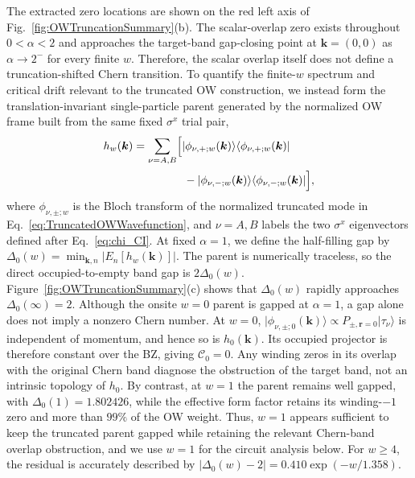 \documentclass[aps,prb,twocolumn,superscriptaddress,longbibliography,floatfix]{revtex4-2}
\newcommand{\mc}[1]{\mathcal{#1}}
\theoremstyle{plain}
\theoremstyle{definition}
\theoremstyle{remark}
\begin{document}
The extracted zero locations are shown on the red left axis of Fig.~\ref{fig:OWTruncationSummary}(b). The scalar-overlap zero exists throughout $0<\alpha<2$ and approaches the target-band gap-closing point at $\boldsymbol k=(0,0)$ as $\alpha\to2^-$ for every finite $w$. Therefore, the scalar overlap itself does not define a truncation-shifted Chern transition. To quantify the finite-$w$ spectrum and critical drift relevant to the truncated OW construction, we instead form the translation-invariant single-particle parent generated by the normalized OW frame built from the same fixed $\sigma^x$ trial pair,
\begin{align}
    h_w(\boldsymbol k)
    &=
    \sum_{\nu=A,B}
    \Bigl[
    \lvert\phi_{\nu,+;w}(\boldsymbol k)\rangle
    \langle\phi_{\nu,+;w}(\boldsymbol k)\rvert
    \nonumber\\[1pt]
    &\hspace{4.5em}
    -
    \lvert\phi_{\nu,-;w}(\boldsymbol k)\rangle
    \langle\phi_{\nu,-;w}(\boldsymbol k)\rvert
    \Bigr],
    \label{eq:TruncatedOWFrameHamiltonian}
\end{align}
where $\phi_{\nu,\pm;w}$ is the Bloch transform of the normalized truncated mode in Eq.~\eqref{eq:TruncatedOWWavefunction}, and $\nu=A,B$ labels the two $\sigma^x$ eigenvectors defined after Eq.~\eqref{eq:chi_CI}. At fixed $\alpha=1$, we define the half-filling gap by $\Delta_0(w)=\min_{\boldsymbol k,n}|E_n[h_w(\boldsymbol k)]|$. The parent is numerically traceless, so the direct occupied-to-empty band gap is $2\Delta_0(w)$. Figure~\ref{fig:OWTruncationSummary}(c) shows that $\Delta_0(w)$ rapidly approaches $\Delta_0(\infty)=2$. Although the onsite $w=0$ parent is gapped at $\alpha=1$, a gap alone does not imply a nonzero Chern number. At $w=0$, $\lvert\phi_{\nu,\pm;0}(\boldsymbol k)\rangle\propto P_{\pm,\boldsymbol r=0}\lvert\tau_\nu\rangle$ is independent of momentum, and hence so is $h_0(\boldsymbol k)$. Its occupied projector is therefore constant over the BZ, giving $\mc C_0=0$. Any winding zeros in its overlap with the original Chern band diagnose the obstruction of the target band, not an intrinsic topology of $h_0$. By contrast, at $w=1$ the parent remains well gapped, with $\Delta_0(1)=1.802426$, while the effective form factor retains its winding-$-1$ zero and more than $99\%$ of the OW weight. Thus, $w=1$ appears sufficient to keep the truncated parent gapped while retaining the relevant Chern-band overlap obstruction, and we use $w=1$ for the circuit analysis below. For $w\geq4$, the residual is accurately described by $|\Delta_0(w)-2|=0.410\exp(-w/1.358)$.
\end{document}
